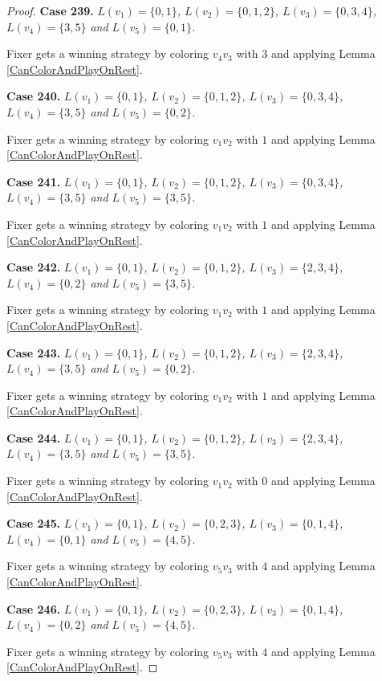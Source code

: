 \documentclass[12pt]{amsart}
\theoremstyle{plain}
\theoremstyle{definition}
\theoremstyle{remark}
\begin{document}
\begin{proof}
\noindent\textbf{Case 239.  }\textit{$L(v_1) = \{0, 1\}$, $L(v_2) = \{0, 1, 2\}$, $L(v_3) = \{0, 3, 4\}$, $L(v_4) = \{3, 5\}$ and $L(v_5) = \{0, 1\}$.}

Fixer gets a winning strategy by coloring $v_4v_3$ with $3$ and applying Lemma \ref{CanColorAndPlayOnRest}.

\noindent\textbf{Case 240.  }\textit{$L(v_1) = \{0, 1\}$, $L(v_2) = \{0, 1, 2\}$, $L(v_3) = \{0, 3, 4\}$, $L(v_4) = \{3, 5\}$ and $L(v_5) = \{0, 2\}$.}

Fixer gets a winning strategy by coloring $v_1v_2$ with $1$ and applying Lemma \ref{CanColorAndPlayOnRest}.

\noindent\textbf{Case 241.  }\textit{$L(v_1) = \{0, 1\}$, $L(v_2) = \{0, 1, 2\}$, $L(v_3) = \{0, 3, 4\}$, $L(v_4) = \{3, 5\}$ and $L(v_5) = \{3, 5\}$.}

Fixer gets a winning strategy by coloring $v_1v_2$ with $1$ and applying Lemma \ref{CanColorAndPlayOnRest}.

\noindent\textbf{Case 242.  }\textit{$L(v_1) = \{0, 1\}$, $L(v_2) = \{0, 1, 2\}$, $L(v_3) = \{2, 3, 4\}$, $L(v_4) = \{0, 2\}$ and $L(v_5) = \{3, 5\}$.}

Fixer gets a winning strategy by coloring $v_1v_2$ with $1$ and applying Lemma \ref{CanColorAndPlayOnRest}.

\noindent\textbf{Case 243.  }\textit{$L(v_1) = \{0, 1\}$, $L(v_2) = \{0, 1, 2\}$, $L(v_3) = \{2, 3, 4\}$, $L(v_4) = \{3, 5\}$ and $L(v_5) = \{0, 2\}$.}

Fixer gets a winning strategy by coloring $v_1v_2$ with $1$ and applying Lemma \ref{CanColorAndPlayOnRest}.

\noindent\textbf{Case 244.  }\textit{$L(v_1) = \{0, 1\}$, $L(v_2) = \{0, 1, 2\}$, $L(v_3) = \{2, 3, 4\}$, $L(v_4) = \{3, 5\}$ and $L(v_5) = \{3, 5\}$.}

Fixer gets a winning strategy by coloring $v_1v_2$ with $0$ and applying Lemma \ref{CanColorAndPlayOnRest}.

\noindent\textbf{Case 245.  }\textit{$L(v_1) = \{0, 1\}$, $L(v_2) = \{0, 2, 3\}$, $L(v_3) = \{0, 1, 4\}$, $L(v_4) = \{0, 1\}$ and $L(v_5) = \{4, 5\}$.}

Fixer gets a winning strategy by coloring $v_5v_3$ with $4$ and applying Lemma \ref{CanColorAndPlayOnRest}.

\noindent\textbf{Case 246.  }\textit{$L(v_1) = \{0, 1\}$, $L(v_2) = \{0, 2, 3\}$, $L(v_3) = \{0, 1, 4\}$, $L(v_4) = \{0, 2\}$ and $L(v_5) = \{4, 5\}$.}

Fixer gets a winning strategy by coloring $v_5v_3$ with $4$ and applying Lemma \ref{CanColorAndPlayOnRest}.


\end{proof}
\end{document}
